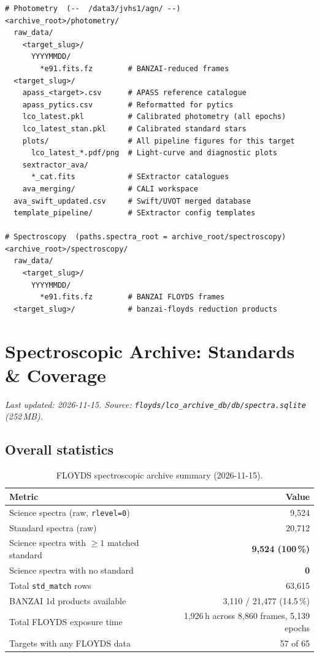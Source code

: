 \documentclass[12pt,a4paper]{article}
\begin{document}
\begin{lstlisting}[style=shell]
# Photometry  (--  /data3/jvhs1/agn/ --)
<archive_root>/photometry/
  raw_data/
    <target_slug>/
      YYYYMMDD/
        *e91.fits.fz        # BANZAI-reduced frames
  <target_slug>/
    apass_<target>.csv      # APASS reference catalogue
    apass_pytics.csv        # Reformatted for pytics
    lco_latest.pkl          # Calibrated photometry (all epochs)
    lco_latest_stan.pkl     # Calibrated standard stars
    plots/                  # All pipeline figures for this target
      lco_latest_*.pdf/png  # Light-curve and diagnostic plots
    sextractor_ava/
      *_cat.fits            # SExtractor catalogues
    ava_merging/            # CALI workspace
  ava_swift_updated.csv     # Swift/UVOT merged database
  template_pipeline/        # SExtractor config templates

# Spectroscopy  (paths.spectra_root = archive_root/spectroscopy)
<archive_root>/spectroscopy/
  raw_data/
    <target_slug>/
      YYYYMMDD/
        *e91.fits.fz        # BANZAI FLOYDS frames
  <target_slug>/            # banzai-floyds reduction products
\end{lstlisting}



\section{Spectroscopic Archive: Standards \& Coverage}
\label{sec:spec-archive}

\textit{Last updated: 2026-11-15. Source:
\texttt{floyds/lco\_archive\_db/db/spectra.sqlite} (252\,MB).}

\subsection{Overall statistics}

\begin{table}[h!]
\centering
\small
\begin{tabular}{lr}
\toprule
Metric & Value \\
\midrule
Science spectra (raw, \texttt{rlevel=0}) & 9{,}524 \\
Standard spectra (raw) & 20{,}712 \\
Science spectra with $\geq 1$ matched standard & \textbf{9{,}524 (100\,\%)} \\
Science spectra with no standard & \textbf{0} \\
Total \texttt{std\_match} rows & 63{,}615 \\
BANZAI 1d products available & 3{,}110 / 21{,}477 (14.5\,\%) \\
Total FLOYDS exposure time & 1{,}926\,h across 8{,}860 frames, 5{,}139 epochs \\
Targets with any FLOYDS data & 57 of 65 \\
\bottomrule
\end{tabular}
\caption{FLOYDS spectroscopic archive summary (2026-11-15).}
\end{table}
\end{document}

